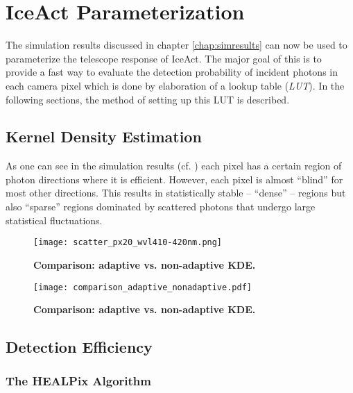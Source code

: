 \chapter{IceAct Parameterization}

The simulation results discussed in chapter \ref{chap:simresults} can now be used to parameterize the telescope response of IceAct. The major goal of this is to provide a fast way to evaluate the detection probability of incident photons in each camera pixel which is done by elaboration of a lookup table (\textit{LUT}). In the following sections, the method of setting up this LUT is described.

\section{Kernel Density Estimation}

As one can see in the simulation results (cf. ) each pixel has a certain region of photon directions where it is efficient. However, each pixel is almost \enquote{blind} for most other directions. This results in statistically stable -- \enquote{dense} -- regions but also \enquote{sparse} regions dominated by scattered photons that undergo large statistical fluctuations. 

\cite{kde:schoenen,kde:wangwang}

\begin{figure}
	\centering
	\texttt{[image: scatter\_px20\_wvl410-420nm.png]}
	\caption[Comparison: adaptive vs. non-adaptive KDE]{\textbf{Comparison: adaptive vs. non-adaptive KDE.} }
	\label{kde:example_scatter}	
\end{figure}

\begin{figure}
	\centering
	\texttt{[image: comparison\_adaptive\_nonadaptive.pdf]}
	\caption[Comparison: adaptive vs. non-adaptive KDE]{\textbf{Comparison: adaptive vs. non-adaptive KDE.} }
	\label{kde:comparison}	
\end{figure}

\section{Detection Efficiency}

\subsection{The HEALPix Algorithm}

